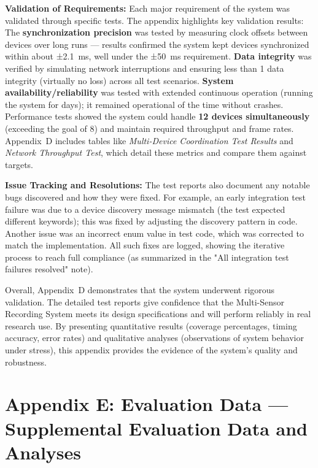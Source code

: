 \textbf{Validation of Requirements:} Each major requirement of the system was
validated through specific tests. The appendix highlights key validation
results: The \textbf{synchronization precision} was tested by measuring clock
offsets between devices over long runs --- results confirmed the system
kept devices synchronized within about ±2.1 ms, well under the ±50 ms
requirement\cite{WebcamCapture}.
\textbf{Data integrity} was verified by simulating network interruptions and
ensuring less than 1%
data integrity (virtually no loss) across all test
scenarios\cite{DriverStressThermal2020}.
\textbf{System availability/reliability} was tested with extended continuous
operation (running the system for days); it remained operational %
of the time without
crashes\cite{DriverStressThermal2020}.
Performance tests showed the system could handle \textbf{12 devices
simultaneously} (exceeding the goal of 8) and maintain required
throughput and frame
rates\cite{ShimmerManager}.
Appendix D includes tables like \textit{Multi-Device Coordination Test Results}
and \textit{Network Throughput Test}, which detail these metrics and compare
them against targets.

\textbf{Issue Tracking and Resolutions:} The test reports also document any
notable bugs discovered and how they were fixed. For example, an early
integration test failure was due to a device discovery message mismatch
(the test expected different keywords); this was fixed by adjusting the
discovery pattern in
code\cite{ShimmerRecorder}.
Another issue was an incorrect enum value in test code, which was
corrected to match the
implementation\cite{ShimmerRecorder}.
All such fixes are logged, showing the iterative process to reach full
compliance (as summarized in the "All integration test failures
resolved"
note\cite{DeviceServer}).

Overall, Appendix D demonstrates that the system underwent rigorous
validation. The detailed test reports give confidence that the
Multi-Sensor Recording System meets its design specifications and will
perform reliably in real research use. By presenting quantitative
results (coverage percentages, timing accuracy, error rates) and
qualitative analyses (observations of system behavior under stress),
this appendix provides the evidence of the system's quality and
robustness.

\section{Appendix E: Evaluation Data --- Supplemental Evaluation Data and Analyses}

